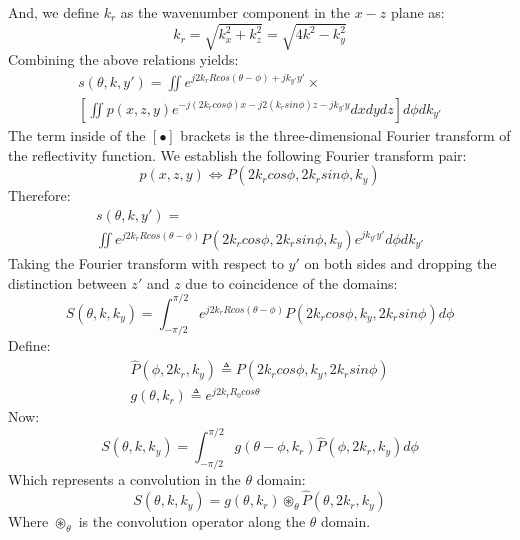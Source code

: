\documentclass[conference]{IEEEtran}
\begin{document}
And, we define $k_r$ as the wavenumber component in the $x-z$ plane as:
\begin{equation}
	k_r = \sqrt{k_x^2+k_z^2} = \sqrt{4k^2 - k_y^2}
\end{equation}
Combining the above relations yields:
\begin{multline}
	s(\theta,k,y') = \iint e^{j2k_rRcos(\theta-\phi) + jk_{y'}y'} \times \\
	\left[ \iint p(x,z,y)e^{-j(2k_rcos\phi)x-j2(k_rsin\phi)z-jk_{y'}y}dxdydz \right] d\phi dk_{y'}
\end{multline}
The term inside of the $[\bullet]$ brackets is the three-dimensional Fourier transform of the reflectivity function. We establish the following Fourier transform pair:
\begin{equation}
	p(x,z,y) \iff P(2k_rcos\phi,2k_rsin\phi,k_y)
\end{equation}
Therefore:
\begin{multline}
	s(\theta,k,y') = \\ \iint e^{j2k_rRcos(\theta-\phi)} P(2k_rcos\phi,2k_rsin\phi,k_y) e^{jk_{y'}y'}d\phi dk_{y'}
\end{multline}
Taking the Fourier transform with respect to $y'$ on both sides and dropping the distinction between $z'$ and $z$ due to coincidence of the domains:
\begin{equation}
	S(\theta,k,k_y) = \int_{-\pi/2}^{\pi/2} e^{j2k_rRcos(\theta-\phi)} P(2k_rcos\phi,k_y,2k_rsin\phi)d\phi 
\end{equation}
Define:
\begin{gather}
	\hat{P}(\phi,2k_r,k_y) \triangleq P(2k_rcos\phi,k_y,2k_rsin\phi) \\
	g(\theta,k_r) \triangleq e^{j2k_rR_0cos\theta}
\end{gather}
Now:
\begin{equation}
S(\theta,k,k_y) = \int_{-\pi/2}^{\pi/2} g(\theta-\phi,k_r) \hat{P}(\phi,2k_r,k_y)d\phi 
\end{equation}
Which represents a convolution in the $\theta$ domain:
\begin{equation}
	S(\theta,k,k_y) = g(\theta,k_r) \circledast_\theta \hat{P}(\theta,2k_r,k_y)
\end{equation}
Where $\circledast_\theta$ is the convolution operator along the $\theta$ domain.
\end{document}

